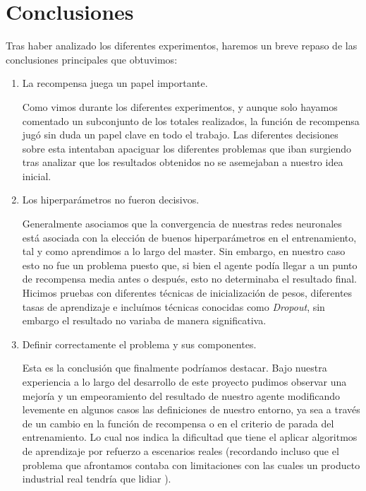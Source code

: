 
\chapter{Conclusiones}
\label{conclusiones}

Tras haber analizado los diferentes experimentos, haremos un breve repaso de las conclusiones principales que obtuvimos:

\begin{enumerate}[label=\destacado{\arabic*.}]
  \setlength\itemsep{1em}
  \item La recompensa juega un papel importante.
  \medskip

  Como vimos durante los diferentes experimentos, y aunque solo hayamos comentado un subconjunto de los totales realizados, la función de recompensa jugó sin duda un papel clave en todo el trabajo. Las diferentes decisiones sobre esta intentaban apaciguar los diferentes problemas que iban surgiendo tras analizar que los resultados obtenidos no se asemejaban a nuestro idea inicial.
  \medskip

  \item Los hiperparámetros no fueron decisivos.
  \medskip

  Generalmente asociamos que la convergencia de nuestras redes neuronales está asociada con la elección de buenos hiperparámetros en el entrenamiento, tal y como aprendimos a lo largo del master. Sin embargo, en nuestro caso esto no fue un problema puesto que, si bien el agente podía llegar a un punto de recompensa media antes o después, esto no determinaba el resultado final. Hicimos pruebas con diferentes técnicas de inicialización de pesos, diferentes tasas de aprendizaje e incluímos técnicas conocidas como \textit{Dropout}, sin embargo el resultado no variaba de manera significativa.
  \medskip

  \item Definir correctamente el problema y sus componentes.
  
  \medskip
  Esta es la conclusión que finalmente podríamos destacar. Bajo nuestra experiencia a lo largo del desarrollo de este proyecto pudimos observar una mejoría y un empeoramiento del resultado de nuestro agente modificando levemente en algunos casos las definiciones de nuestro entorno, ya sea a través de un cambio en la función de recompensa o en el criterio de parada del entrenamiento. Lo cual nos indica la dificultad que tiene el aplicar algoritmos de aprendizaje por refuerzo a escenarios reales (recordando incluso que el problema que afrontamos contaba con limitaciones con las cuales un producto industrial real tendría que lidiar ).
  \medskip

\end{enumerate}

